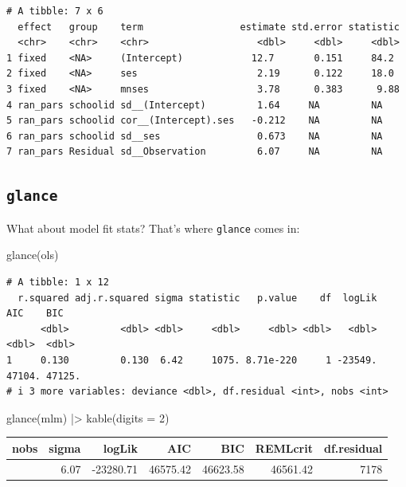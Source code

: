 \documentclass[
  letterpaper,
  DIV=11,
  numbers=noendperiod]{scrreprt}
\newenvironment{Shaded}{\begin{snugshade}}{\end{snugshade}}
\newcommand{\AttributeTok}[1]{\textcolor[rgb]{0.49,0.56,0.16}{#1}}
\newcommand{\DecValTok}[1]{\textcolor[rgb]{0.25,0.63,0.44}{#1}}
\newcommand{\FunctionTok}[1]{\textcolor[rgb]{0.02,0.16,0.49}{#1}}
\newcommand{\NormalTok}[1]{\textcolor[rgb]{0.00,0.44,0.13}{#1}}
\newcommand{\SpecialCharTok}[1]{\textcolor[rgb]{0.25,0.44,0.63}{#1}}
\begin{document}
\begin{verbatim}
# A tibble: 7 x 6
  effect   group    term                 estimate std.error statistic
  <chr>    <chr>    <chr>                   <dbl>     <dbl>     <dbl>
1 fixed    <NA>     (Intercept)            12.7       0.151     84.2 
2 fixed    <NA>     ses                     2.19      0.122     18.0 
3 fixed    <NA>     mnses                   3.78      0.383      9.88
4 ran_pars schoolid sd__(Intercept)         1.64     NA         NA   
5 ran_pars schoolid cor__(Intercept).ses   -0.212    NA         NA   
6 ran_pars schoolid sd__ses                 0.673    NA         NA   
7 ran_pars Residual sd__Observation         6.07     NA         NA   
\end{verbatim}

\hypertarget{glance}{%
\subsection{\texorpdfstring{\texttt{glance}}{glance}}\label{glance}}

What about model fit stats? That's where \texttt{glance} comes in:

\begin{Shaded}
\begin{Highlighting}[]
\FunctionTok{glance}\NormalTok{(ols)}
\end{Highlighting}
\end{Shaded}

\begin{verbatim}
# A tibble: 1 x 12
  r.squared adj.r.squared sigma statistic   p.value    df  logLik    AIC    BIC
      <dbl>         <dbl> <dbl>     <dbl>     <dbl> <dbl>   <dbl>  <dbl>  <dbl>
1     0.130         0.130  6.42     1075. 8.71e-220     1 -23549. 47104. 47125.
# i 3 more variables: deviance <dbl>, df.residual <int>, nobs <int>
\end{verbatim}

\begin{Shaded}
\begin{Highlighting}[]
\FunctionTok{glance}\NormalTok{(mlm) }\SpecialCharTok{|\textgreater{}} 
  \FunctionTok{kable}\NormalTok{(}\AttributeTok{digits =} \DecValTok{2}\NormalTok{)}
\end{Highlighting}
\end{Shaded}

\begin{longtable}[]{@{}rrrrrrr@{}}
\toprule\noalign{}
nobs & sigma & logLik & AIC & BIC & REMLcrit & df.residual \\
\midrule\noalign{}
\endhead
\bottomrule\noalign{}
\endlastfoot
7185 & 6.07 & -23280.71 & 46575.42 & 46623.58 & 46561.42 & 7178 \\
\end{longtable}
\end{document}
